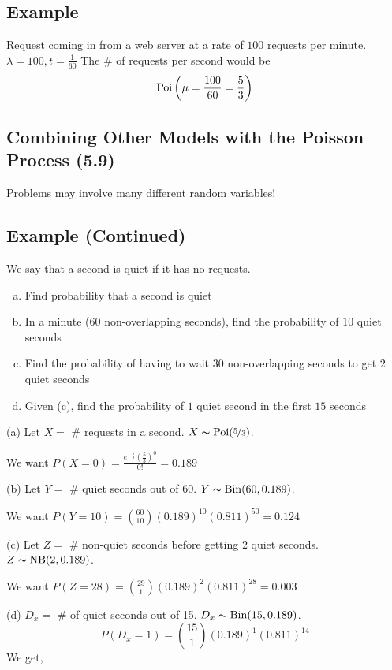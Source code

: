 \subsection{Example}
Request coming in from a web server at a rate of $ 100 $ requests per minute.
$ \lambda = 100, t=\frac{1}{60} $
The \# of requests per second would be
\[ \operatorname{Poi}\left(\mu=\frac{100}{60}=\frac{5}{3}\right) \]

\subsection{Combining Other Models with the Poisson Process (5.9)}
Problems may involve many different random variables!

\subsection{Example (Continued)}
We say that a second is quiet if it has no requests.
\begin{enumerate}[(a)]
    \item Find probability that a second is quiet
    \item In a minute ($60$ non-overlapping seconds), find the probability of $10$ quiet seconds
    \item Find the probability of having to wait $ 30 $ non-overlapping seconds to get $ 2 $ quiet seconds
    \item Given (c), find the probability of $ 1 $ quiet second in the first $ 15 $ seconds
\end{enumerate}
(a) Let $ X= $ \# requests in a second. $ X \thicksim \operatorname{Poi}(\nicefrac{5}{3}) $.

We want $ P(X=0)=\frac{e^{-\frac{5}{3}}\left(\frac{5}{3}\right)^0}{0!}=0.189 $


(b) Let $ Y= $ \# quiet seconds out of 60. $ Y \thicksim \operatorname{Bin}(60,0.189) $.

We want $ P(Y=10)=\binom{60}{10}(0.189)^{10}(0.811)^{50}=0.124 $

(c) Let $ Z= $ \# non-quiet seconds before getting $ 2 $ quiet seconds. 
$ Z \thicksim \operatorname{NB}(2,0.189) $.

We want $ P(Z=28)=\binom{29}{1}(0.189)^2(0.811)^{28}=0.003 $

(d) $ D_x=$ \# of quiet seconds out of 15. $ D_x \thicksim \operatorname{Bin}(15,0.189) $.
\[ P(D_x=1)=\binom{15}{1}(0.189)^1(0.811)^{14} \]
We get,

